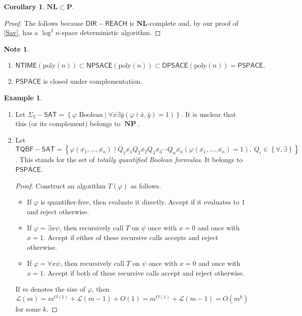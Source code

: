 \documentclass[10pt,letterpaper,cm]{nupset}
\theoremstyle{definition}
\newtheorem{exmp}[definition]{Example}
\newtheorem{note}[definition]{Note}
\theoremstyle{theorem}
\newtheorem{corollary}[definition]{Corollary}
\theoremstyle{remark}
\newcommand{\1}{\mathbf{1}}
\newcommand{\0}{\vec 0}
\DeclareMathOperator{\NP}{\mathbf{NP}}
\begin{document}
\begin{corollary}
$\mathbf{NL} \subset \mathbf{P}$.
\end{corollary}
\begin{proof}
The follows because $\mathsf{DIR{-}REACH}$ is  $\mathbf{NL}$-complete and, by our proof of \cref{Sav}, has a $\log^2{n}$-space deterministic algorithm.
\end{proof}

\begin{note} $ $
\begin{enumerate}
\item $\mathsf{NTIME}(\text{poly}(n)) \subset \mathsf{NPSACE}(\text{poly}(n)) \subset \mathsf{DPSACE}(\text{poly}(n)) = \mathsf{PSPACE}.$
\item $\mathsf{PSPACE}$ is closed under complementation. 
\end{enumerate}
\end{note}

\begin{exmp} $ $
\begin{enumerate}
\item Let $\Sigma_2{-}\mathsf{SAT} = \left\{\varphi \text{ Boolean} \mid \forall \bar{x} \exists \bar{y}(\varphi(\bar{x}, \bar{y}) = 1)\right\}$. It is unclear that this (or its complement) belongs to $\NP$. 
\item Let $\mathsf{TQBF{-}SAT} = \left\{ \varphi\left(\overline{x_1}, \ldots, \overline{x_n}\right) \mid Q_1 \overline{x_1} Q_2 \overline{x_2}Q_3 \overline{x_3} \cdots Q_n \overline{x_n} \left(\varphi\left(\overline{x_1}, \ldots, \overline{x_n}\right) = 1\right), \ Q_i \in \left\{\forall, \exists\right\} \right\}$. This stands for the set of \textit{totally quantified Boolean formulas}. It belongs to $\mathsf{PSPACE}$.
\begin{proof}
Construct an algorithm $T(\varphi)$ as follows. 
\begin{itemize}
\item If $\varphi$ is quantifier-free, then evaluate it directly. Accept if it evaluates to $1$ and reject otherwise. 
\item If $\varphi = \exists x \psi$, then recursively call $T$ on $\psi$ once with $x=0$ and once with $x=1$. Accept if either of these recursive calls accepts and reject otherwise. 
\item If  $\varphi = \forall x \psi$, then recursively call $T$ on $\psi$ once with $x=0$ and once with $x=1$. Accept if both of these recursive calls accept and reject otherwise. 
\end{itemize} 
If $m$ denotes the size of $\varphi$, then $$\mathcal{L}(m) = m^{O(1)} + \mathcal{L}(m-1) + O(1) = m^{O(1)} + \mathcal{L}(m-1) = O(m^k)$$ for some $k$.
\end{proof}
\end{enumerate}
\end{exmp}
\end{document}
